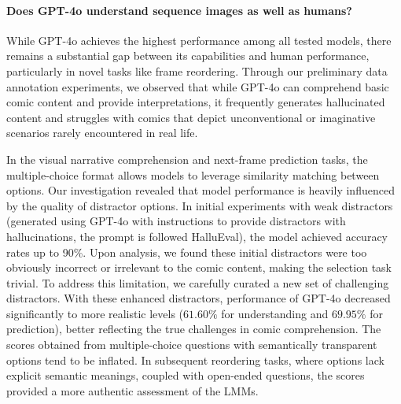 \begin{table}[htbp]
    \centering
    \caption{Performance on Qwen2-VL-7B and LLaVA-1.6-7B finetuned with reordering task data. Reordering-C refers to the Reordering-choice. Reordering-G refers to the Reordering-generation}
    \label{tab:finetune}
\end{table}

\paragraph{Does GPT-4o understand sequence images as well as humans?}
While GPT-4o achieves the highest performance among all tested models, there remains a substantial gap between its capabilities and human performance, particularly in novel tasks like frame reordering. Through our preliminary data annotation experiments, we observed that while GPT-4o can comprehend basic comic content and provide interpretations, it frequently generates hallucinated content and struggles with comics that depict unconventional or imaginative scenarios rarely encountered in real life.

In the visual narrative comprehension and next-frame prediction tasks, the multiple-choice format allows models to leverage similarity matching between options. Our investigation revealed that model performance is heavily influenced by the quality of distractor options. In initial experiments with weak distractors (generated using GPT-4o with instructions to provide distractors with hallucinations, the prompt is followed HalluEval), the model achieved accuracy rates up to 90\%. Upon analysis, we found these initial distractors were too obviously incorrect or irrelevant to the comic content, making the selection task trivial. To address this limitation, we carefully curated a new set of challenging distractors. With these enhanced distractors, performance of GPT-4o decreased significantly to more realistic levels ($61.60\%$ for understanding and $69.95\%$ for prediction), better reflecting the true challenges in comic comprehension. The scores obtained from multiple-choice questions with semantically transparent options tend to be inflated. In subsequent reordering tasks, where options lack explicit semantic meanings, coupled with open-ended questions, the scores provided a more authentic assessment of the LMMs.

